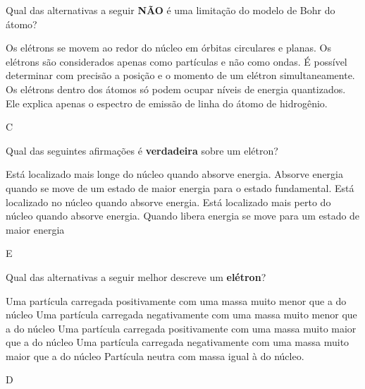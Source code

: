 \documentclass[9 pt]{scrartcl}
\def\PQ{0.84} %
\begin{document}
\begin{exercise}[points=\PQ]
Qual das alternativas a seguir \textbf{NÃO} é uma limitação do modelo de Bohr do átomo?

\begin{choice}
\choice Os elétrons se movem ao redor do núcleo em órbitas circulares e planas.
\choice Os elétrons são considerados apenas como partículas e não como ondas.
\choice É possível determinar com precisão a posição e o momento de um elétron simultaneamente.
\choice Os elétrons dentro dos átomos só podem ocupar níveis de energia quantizados.
\choice Ele explica apenas o espectro de emissão de linha do átomo de hidrogênio.
\end{choice}
\end{exercise}
\begin{solution}
C
\end{solution}



\begin{exercise}[points=\PQ]
Qual das seguintes afirmações é \textbf{verdadeira} sobre um elétron?

\begin{choice}
\choice Está localizado mais longe do núcleo quando absorve energia.
\choice Absorve energia quando se move de um estado de maior energia para o estado fundamental.
\choice Está localizado no núcleo quando absorve energia.
\choice Está localizado mais perto do núcleo quando absorve energia.
\choice Quando libera energia se move para um estado de maior energia
\end{choice}
\end{exercise}
\begin{solution}
E
\end{solution}



\begin{exercise}[points=\PQ]
Qual das alternativas a seguir melhor descreve um \textbf{elétron}?
\begin{choice}
\choice Uma partícula carregada positivamente com uma massa muito menor que a do núcleo
\choice Uma partícula carregada negativamente com uma massa muito menor que a do núcleo
\choice Uma partícula carregada positivamente com uma massa muito maior que a do núcleo
\choice Uma partícula carregada negativamente com uma massa muito maior que a do núcleo
\choice Partícula neutra com massa igual à do núcleo.
\end{choice}
\end{exercise}
\begin{solution}
D
\end{solution}
\end{document}
